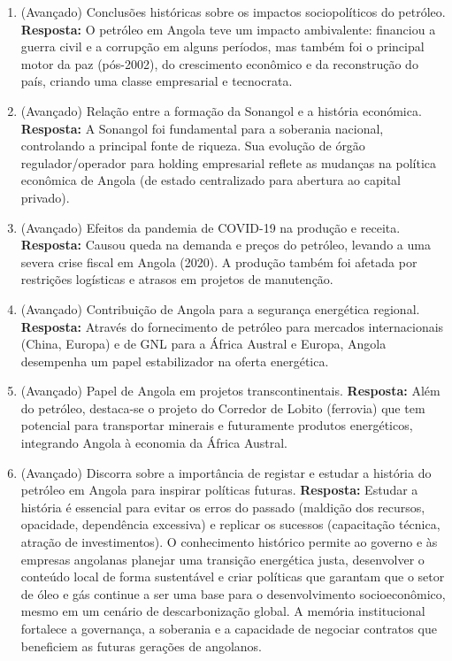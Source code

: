 \documentclass[11pt,a4paper]{article}
\begin{document}
\begin{enumerate}
  \item (Avançado) Conclusões históricas sobre os impactos sociopolíticos do petróleo.
  \textbf{Resposta:} O petróleo em Angola teve um impacto ambivalente: financiou a guerra civil e a corrupção em alguns períodos, mas também foi o principal motor da paz (pós-2002), do crescimento econômico e da reconstrução do país, criando uma classe empresarial e tecnocrata.

  \item (Avançado) Relação entre a formação da Sonangol e a história económica.
  \textbf{Resposta:} A Sonangol foi fundamental para a soberania nacional, controlando a principal fonte de riqueza. Sua evolução de órgão regulador/operador para holding empresarial reflete as mudanças na política econômica de Angola (de estado centralizado para abertura ao capital privado).

  \item (Avançado) Efeitos da pandemia de COVID-19 na produção e receita.
  \textbf{Resposta:} Causou queda na demanda e preços do petróleo, levando a uma severa crise fiscal em Angola (2020). A produção também foi afetada por restrições logísticas e atrasos em projetos de manutenção.

  \item (Avançado) Contribuição de Angola para a segurança energética regional.
  \textbf{Resposta:} Através do fornecimento de petróleo para mercados internacionais (China, Europa) e de GNL para a África Austral e Europa, Angola desempenha um papel estabilizador na oferta energética.

  \item (Avançado) Papel de Angola em projetos transcontinentais.
  \textbf{Resposta:} Além do petróleo, destaca-se o projeto do Corredor de Lobito (ferrovia) que tem potencial para transportar minerais e futuramente produtos energéticos, integrando Angola à economia da África Austral.

  \item (Avançado) Discorra sobre a importância de registar e estudar a história do petróleo em Angola para inspirar políticas futuras.
  \textbf{Resposta:} Estudar a história é essencial para evitar os erros do passado (maldição dos recursos, opacidade, dependência excessiva) e replicar os sucessos (capacitação técnica, atração de investimentos). O conhecimento histórico permite ao governo e às empresas angolanas planejar uma transição energética justa, desenvolver o conteúdo local de forma sustentável e criar políticas que garantam que o setor de óleo e gás continue a ser uma base para o desenvolvimento socioeconômico, mesmo em um cenário de descarbonização global. A memória institucional fortalece a governança, a soberania e a capacidade de negociar contratos que beneficiem as futuras gerações de angolanos.
\end{enumerate}
\end{document}
